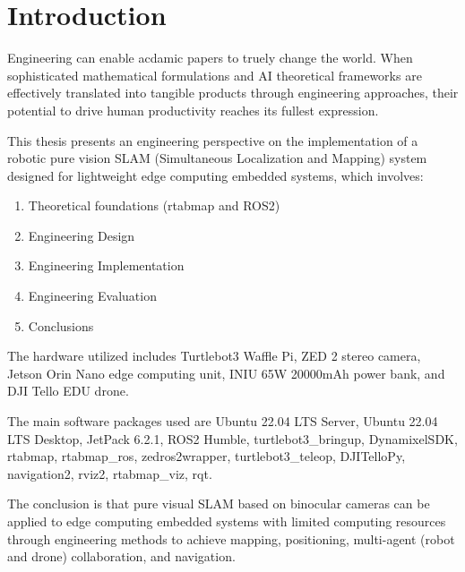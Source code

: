 \chapter{Introduction\label{chap:introduction}}

Engineering can enable acdamic papers to truely change the world. When sophisticated mathematical formulations and AI theoretical frameworks are effectively translated into tangible products through engineering approaches, their potential to drive human productivity reaches its fullest expression.

This thesis presents an engineering perspective on the implementation of a robotic pure vision SLAM (Simultaneous Localization and Mapping) system designed for lightweight edge computing embedded systems, which involves:

\begin{enumerate}
    \item Theoretical foundations (rtabmap and ROS2)
    \item Engineering Design
    \item Engineering Implementation
    \item Engineering Evaluation
    \item Conclusions
\end{enumerate}

The hardware utilized includes Turtlebot3 Waffle Pi, ZED 2 stereo camera, Jetson Orin Nano edge computing unit, INIU 65W 20000mAh power bank, and DJI Tello EDU drone.

The main software packages used are Ubuntu 22.04 LTS Server, Ubuntu 22.04 LTS Desktop, JetPack 6.2.1, ROS2 Humble, turtlebot3\_bringup, DynamixelSDK, rtabmap, rtabmap\_ros, zed\-ros2\-wrapper, turtlebot3\_teleop, DJITelloPy, navigation2, rviz2, rtabmap\_viz, rqt.

The conclusion is that pure visual SLAM based on binocular cameras can be applied to edge computing embedded systems with limited computing resources through engineering methods to achieve mapping, positioning, multi-agent (robot and drone) collaboration, and navigation. 